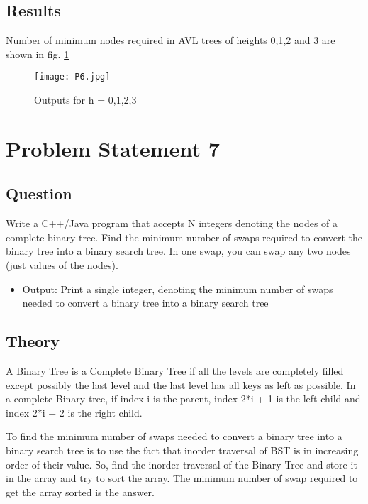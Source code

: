 \documentclass[11pt,a4paper]{article}
\begin{document}
\subsection{Results}\label{sec:results6}
Number of minimum nodes required in AVL trees of heights 0,1,2 and 3 are shown in fig. \ref{fig:output_6}
\begin{figure}[h]
\texttt{[image: P6.jpg]}
\centering
\caption{Outputs for h = 0,1,2,3}
\label{fig:output_6}
\end{figure}

\clearpage

\section{Problem Statement 7}\label{sec:problem7}
\subsection{Question}\label{sec:question7}
Write a C++/Java program that accepts N integers denoting the nodes of a complete binary tree. Find the minimum number of swaps required to convert the binary tree into a binary search tree. In one swap, you can swap any two nodes (just values of the nodes).
\begin{itemize}
    \item Output: Print a single integer, denoting the minimum number of swaps needed to convert a binary tree into a binary search tree
\end{itemize}

\subsection{Theory}\label{sec:theory7}
A Binary Tree is a Complete Binary Tree if all the levels are completely filled except possibly the last level and the last level has all keys as left as possible. In a complete Binary tree, if index i is the parent, index 2*i + 1 is the left child and index 2*i + 2 is the right child.

To find the minimum number of swaps needed to convert a binary tree into a binary search tree is  to use the fact that inorder traversal of BST is in increasing order of their value. So, find the inorder traversal of the Binary Tree and store it in the array and try to sort the array. The minimum number of swap required to get the array sorted is the answer.
\end{document}
